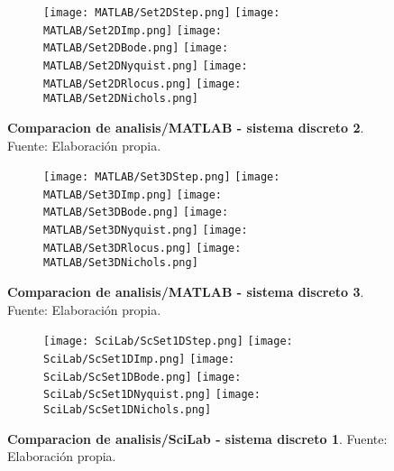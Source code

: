     \begin{figure}[htb]
        \centering
        \begin{subfigure}[t]{0.99\textwidth}
            \centering
            \texttt{[image: MATLAB/Set2DStep.png]}
            \texttt{[image: MATLAB/Set2DImp.png]}
            \texttt{[image: MATLAB/Set2DBode.png]}
            \texttt{[image: MATLAB/Set2DNyquist.png]}
            \texttt{[image: MATLAB/Set2DRlocus.png]}
            \texttt{[image: MATLAB/Set2DNichols.png]}
            \label{fig:Set2Dsub}
        \end{subfigure}
        \caption[Comparacion de analisis/MATLAB - sistema discreto 2]{\textbf{Comparacion de analisis/MATLAB - sistema discreto 2}. Fuente: Elaboración propia. \label{fig:Set2D}}
    \end{figure}

    \begin{figure}[htb]
        \centering
        \begin{subfigure}[t]{0.99\textwidth}
            \centering
            \texttt{[image: MATLAB/Set3DStep.png]}
            \texttt{[image: MATLAB/Set3DImp.png]}
            \texttt{[image: MATLAB/Set3DBode.png]}
            \texttt{[image: MATLAB/Set3DNyquist.png]}
            \texttt{[image: MATLAB/Set3DRlocus.png]}
            \texttt{[image: MATLAB/Set3DNichols.png]}
            \label{fig:Set3Dsub}
        \end{subfigure}
        \caption[Comparacion de analisis/MATLAB - sistema discreto 3]{\textbf{Comparacion de analisis/MATLAB - sistema discreto 3}. Fuente: Elaboración propia. \label{fig:Set3D}}
    \end{figure}

    \begin{figure}[htb]
        \centering
        \begin{subfigure}[t]{0.99\textwidth}
            \centering
            \texttt{[image: SciLab/ScSet1DStep.png]}
            \texttt{[image: SciLab/ScSet1DImp.png]}
            \texttt{[image: SciLab/ScSet1DBode.png]}
            \texttt{[image: SciLab/ScSet1DNyquist.png]}
            \texttt{[image: SciLab/ScSet1DNichols.png]}
            \label{fig:ScSet1Dsub}
        \end{subfigure}
        \caption[Comparacion de analisis/SciLab - sistema discreto 1]{\textbf{Comparacion de analisis/SciLab - sistema discreto 1}. Fuente: Elaboración propia. \label{fig:ScSet1D}}
    \end{figure}

